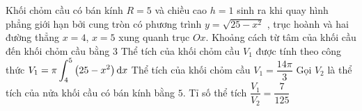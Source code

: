 \begin{ex}%
	Khối chỏm cầu  có bán kính $R=5$ và chiều cao $h=1$ sinh ra khi quay hình phẳng giới hạn bởi cung tròn có phương trình $y=\sqrt{25-x^2}$ , trục hoành và hai đường thẳng $x=4$, $x=5$ xung quanh trục $Ox$.
	 \choiceTF
		 {Khoảng cách từ tâm của khối cầu đến khối chỏm cầu bằng $3$}
		{\True Thể tích  của khối chỏm cầu $V_1$ được tính theo công thức $V_1=\pi\displaystyle\int_4^5\left(25-x^2\right){\rm{d}}x$}
		{\True Thể  tích của khối chỏm cầu $V_1=\dfrac{14\pi}{3}$}
		{\True Gọi $V_2$ là thể tích của nửa khối cầu có bán kính bằng $5$. Tỉ số thể tích $\dfrac{V_1}{V_2}=\dfrac{7}{125}$} 
\end{ex}

